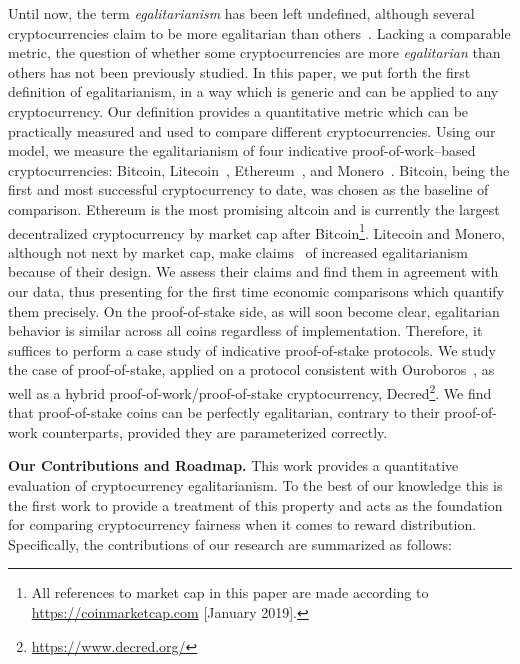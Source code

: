 Until now, the term \emph{egalitarianism} has been left undefined, although
several cryptocurrencies claim to be more egalitarian than others~\cite{van2013cryptonote,mcmillan2013}.
Lacking a comparable metric, the question of whether some cryptocurrencies are
more \emph{egalitarian} than others has not been previously studied. In this paper, we
put forth the first definition of egalitarianism, in a way which is
generic and can be applied to any cryptocurrency.
Our definition provides a quantitative metric which can be practically measured and used
to compare different cryptocurrencies.
Using our model, we measure the egalitarianism of
four indicative proof-of-work--based
cryptocurrencies: Bitcoin, Litecoin~\cite{lee2011litecoin}, Ethereum~\cite{buterin,wood2014ethereum}, and Monero~\cite{van2013cryptonote}. Bitcoin, being the first and most successful cryptocurrency to date, was chosen as
the baseline of comparison. Ethereum is the most promising altcoin and is currently the largest decentralized cryptocurrency by market cap after Bitcoin\footnote{All references to market cap in this paper are made according to \url{https://coinmarketcap.com} [January 2019].}.
Litecoin and Monero, although not next by market cap,
make claims~\cite{van2013cryptonote,mcmillan2013} of increased egalitarianism because of their design.
We assess their claims and find them in agreement with our data, thus presenting for the first time economic comparisons which quantify them precisely.
On the proof-of-stake side, as will soon become clear, egalitarian
behavior is similar across all coins regardless of implementation. Therefore,
it suffices to perform a case study of indicative proof-of-stake protocols.
We study the case of proof-of-stake, applied on a protocol consistent with Ouroboros~\cite{C:KRDO17},
as well as a hybrid proof-of-work/proof-of-stake cryptocurrency,
Decred\footnote{\url{https://www.decred.org/}}. We find that proof-of-stake coins can be perfectly
egalitarian, contrary to their proof-of-work counterparts, provided they are parameterized correctly.

\noindent
\textbf{Our Contributions and Roadmap.}
This work provides a quantitative evaluation of cryptocurrency egalitarianism.
To the best of our knowledge this is the first work to provide a
treatment of this property and acts as the foundation for comparing
cryptocurrency fairness when it comes to reward distribution.
Specifically, the contributions of our research are summarized as follows:

